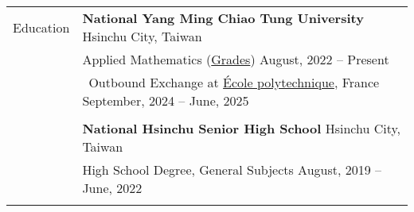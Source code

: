 \documentclass[letterpaper, 11pt]{article}
\begin{document}
\begin{center}
    \begin{longtable}{p{0.76in}p{5.93in}}

        
        
        
        \textcolor{OliveGreen}{Education} 
        & \textbf{National Yang Ming Chiao Tung University} \hfill Hsinchu City, Taiwan \\ 
        & Applied Mathematics (\href{https://docs.google.com/spreadsheets/d/1hz9FwNdFio4EajAw5VN3lpa6QyxIE2GJ6FpHmMoSaaQ/edit?usp=sharing}{Grades}) \hfill August, 2022 -- Present \\
        & \qquad \  Outbound Exchange at \href{https://www.polytechnique.edu}{\'Ecole polytechnique}, France \hfill September, 2024 -- June, 2025 \\
        & \\
        
        & \textbf{National Hsinchu Senior High School} \hfill Hsinchu City, Taiwan \\
        & High School Degree, General Subjects \hfill August, 2019 -- June, 2022\\
        & \\
        
        

\end{longtable}
\end{center}
\end{document}
